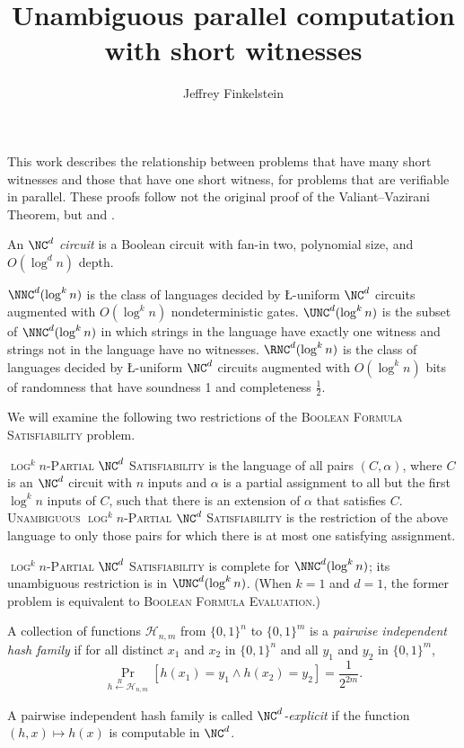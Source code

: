 \documentclass{article}
\title{Unambiguous parallel computation with short witnesses}
\author{Jeffrey Finkelstein}
\newcommand{\random}{\overset{R}{\gets}}
\newcommand{\PSAT}{\textsc{$\log^k n$-Partial $\NC^d$ Satisfiability}}
\newcommand{\UPSAT}{\textsc{Unambiguous $\log^k n$-Partial $\NC^d$ Satisfiability}}
\begin{document}
\maketitle

This work describes the relationship between problems that have many short witnesses and those that have one short witness, for problems that are verifiable in parallel.
These proofs follow not the original proof of the Valiant--Vazirani Theorem, but \cite{trevisan10} and \cite{ab09}.

\begin{definition}
  An \emph{$\NC^d$ circuit} is a Boolean circuit with fan-in two, polynomial size, and $O(\log^d n)$ depth.
\end{definition}

\begin{definition}
  $\NNC^d(\log^k n)$ is the class of languages decided by \L-uniform $\NC^d$ circuits augmented with $O(\log^k n)$ nondeterministic gates.
  $\UNC^d(\log^k n)$ is the subset of $\NNC^d(\log^k n)$ in which strings in the language have exactly one witness and strings not in the language have no witnesses.
  $\RNC^d(\log^k n)$ is the class of languages decided by \L-uniform $\NC^d$ circuits augmented with $O(\log^k n)$ bits of randomness that have soundness 1 and completeness $\frac{1}{2}$.
\end{definition}

We will examine the following two restrictions of the \textsc{Boolean Formula Satisfiability} problem.

\begin{definition}
  \PSAT{} is the language of all pairs $(C, \alpha)$, where $C$ is an $\NC^d$ circuit with $n$ inputs and $\alpha$ is a partial assignment to all but the first $\log^k n$ inputs of $C$, such that there is an extension of $\alpha$ that satisfies $C$.
  \UPSAT{} is the restriction of the above language to only those pairs for which there is at most one satisfying assignment.
\end{definition}

\PSAT{} is complete for $\NNC^d(\log^k n)$; its unambiguous restriction is in $\UNC^d(\log^k n)$.
(When $k = 1$ and $d = 1$, the former problem is equivalent to \textsc{Boolean Formula Evaluation}.)

\begin{definition}
  A collection of functions $\mathcal{H}_{n, m}$ from $\{0, 1\}^n$ to $\{0, 1\}^m$ is a \emph{pairwise independent hash family} if for all distinct $x_1$ and $x_2$ in $\{0, 1\}^n$ and all $y_1$ and $y_2$ in $\{0, 1\}^m$,
  \begin{equation*}
    \Pr_{h \random \mathcal{H}_{n, m}}\left[h(x_1) = y_1 \land h(x_2) = y_2\right] = \frac{1}{2^{2m}}.
  \end{equation*}

  A pairwise independent hash family is called \emph{$\NC^d$-explicit} if the function $(h, x) \mapsto h(x)$ is computable in $\NC^d$.
\end{definition}
\end{document}
